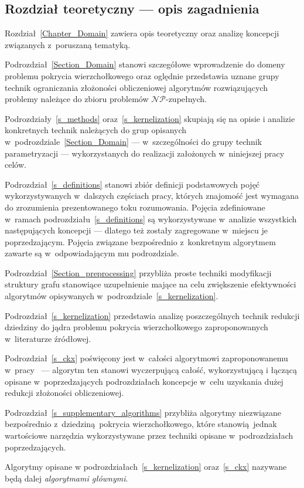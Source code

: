 \subsection{Rozdział teoretyczny --- opis zagadnienia}
\par{
  Rozdział~\ref{Chapter_Domain} zawiera opis teoretyczny oraz analizę koncepcji związanych z~poruszaną tematyką.

  Podrozdział~\ref{Section_Domain} stanowi szczegółowe wprowadzenie do domeny problemu pokrycia wierzchołkowego oraz oględnie przedstawia uznane grupy technik ograniczania złożoności obliczeniowej algorytmów rozwiązujących problemy należące do zbioru problemów $\mathcal{NP}$-zupełnych.

  Podrozdziały~\ref{s_methods} oraz~\ref{s_kernelization} skupiają się na opisie i analizie konkretnych technik należących do grup opisanych w~podrozdziale~\ref{Section_Domain} --- w~szczególności do grupy technik parametryzacji --- wykorzystanych do realizacji założonych w~niniejszej pracy celów.

  Podrozdział~\ref{s_definitions} stanowi zbiór definicji podstawowych pojęć wykorzystywanych w~dalszych częściach pracy, których znajomość jest wymagana do zrozumienia prezentowanego toku rozumowania.
  Pojęcia zdefiniowane w~ramach podrozdziału~\ref{s_definitions} są wykorzystywane w~analizie wszystkich następujących koncepcji --- dlatego też zostały zagregowane w~miejscu je poprzedzającym.
  Pojęcia związane bezpośrednio z~konkretnym algorytmem zawarte są w~odpowiadającym mu podrozdziale.

  Podrozdział~\ref{Section_preprocessing} przybliża proste techniki modyfikacji struktury grafu stanowiące uzupełnienie mające na celu zwiększenie efektywności algorytmów opisywanych w~podrozdziale~\ref{s_kernelization}.

  Podrozdział~\ref{s_kernelization} przedstawia analizę poszczególnych technik redukcji dziedziny do jądra problemu pokrycia wierzchołkowego zaproponowanych w~literaturze źródłowej.

  Podrozdział~\ref{s_ckx} poświęcony jest w~całości algorytmowi zaproponowanemu w~pracy~\cite{ImprovedBounds10} --- algorytm ten stanowi wyczerpującą całość, wykorzystującą i łączącą opisane w~poprzedzających podrozdziałach koncepcje w~celu uzyskania dużej redukcji złożoności obliczeniowej.

  Podrozdział~\ref{s_supplementary_algorithms} przybliża algorytmy niezwiązane bezpośrednio z~dziedziną pokrycia wierzchołkowego, które stanowią jednak wartościowe narzędzia wykorzystywane przez techniki opisane w~podrozdziałach poprzedzających.

  Algorytmy opisane w podrozdziałach~\ref{s_kernelization} oraz~\ref{s_ckx} nazywane będą dalej \emph{algorytmami głównymi}.
}
